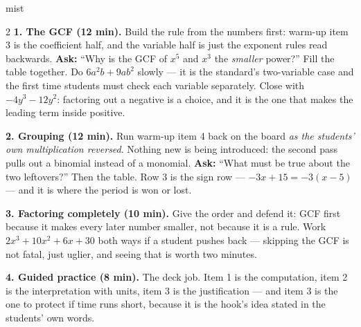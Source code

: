 \documentclass[10pt]{article}
\begin{document}
\boxguard
\begin{skillbox}[Lesson]{mist}
\begin{multicols}{2}
\textbf{1. The GCF (12 min).} Build the rule from the numbers first: warm-up item 3 is the
coefficient half, and the variable half is just the exponent rules read backwards. \textbf{Ask:}
``Why is the GCF of $x^5$ and $x^3$ the \emph{smaller} power?'' Fill the table together. Do
$6a^2b+9ab^2$ slowly --- it is the standard's two-variable case and the first time students must
check each variable separately. Close with $-4y^3-12y^2$: factoring out a negative is a choice, and
it is the one that makes the leading term inside positive.

\textbf{2. Grouping (12 min).} Run warm-up item 4 back on the board \emph{as the students' own
multiplication reversed}. Nothing new is being introduced: the second pass pulls out a binomial
instead of a monomial. \textbf{Ask:} ``What must be true about the two leftovers?'' Then the table.
Row 3 is the sign row --- $-3x+15=-3(x-5)$ --- and it is where the period is won or lost.

\textbf{3. Factoring completely (10 min).} Give the order and defend it: GCF first because it makes
every later number smaller, not because it is a rule. Work $2x^3+10x^2+6x+30$ both ways if a
student pushes back --- skipping the GCF is not fatal, just uglier, and seeing that is worth two
minutes.

\textbf{4. Guided practice (8 min).} The deck job. Item 1 is the computation, item 2 is the
interpretation with units, item 3 is the justification --- and item 3 is the one to protect if time
runs short, because it is the hook's idea stated in the students' own words.
\end{multicols}
\end{skillbox}
\end{document}
